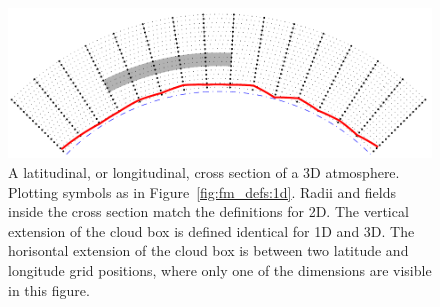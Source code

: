 \begin{figure}[!p]
 \begin{center}
  \includegraphics*[width=0.98\hsize]{Figs/fm_definitions/atm_dim_3dcross}
  \caption{A latitudinal, or longitudinal, cross section of a 3D atmosphere. 
    Plotting symbols as in Figure~\ref{fig:fm_defs:1d}. Radii and
    fields inside the cross section match the definitions for 2D.
    The vertical extension
    of the cloud box is defined identical for 1D and 3D. The horisontal 
    extension of the cloud box is between two latitude and longitude grid
    positions, where only one of the dimensions are visible in this figure.}
  \label{fig:fm_defs:3dcross}
 \end{center}
\end{figure}



\label{sec:fm_defs:altitudes}

